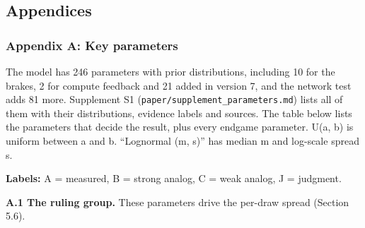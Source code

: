 \documentclass[
  10pt,
]{article}
\begin{document}
\subsection{Appendices}\label{appendices}

\subsubsection{Appendix A: Key parameters}\label{appendix-a-key-parameters}

The model has 246 parameters with prior distributions, including 10 for the brakes, 2 for compute
feedback and 21 added in version 7, and the network test adds 81 more. Supplement S1
(\texttt{paper/supplement\_parameters.md}) lists all of them with their distributions, evidence
labels and sources. The table below lists the parameters that decide the result, plus every endgame
parameter. U(a, b) is uniform between a and b. ``Lognormal (m, s)'' has median m and log-scale
spread s.

\textbf{Labels:} A = measured, B = strong analog, C = weak analog, J = judgment.

\textbf{A.1 The ruling group.} These parameters drive the per-draw spread (Section 5.6).
\end{document}
